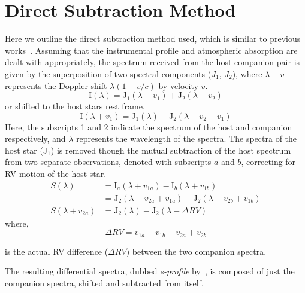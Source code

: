 \documentclass[fleqn,usenatbib]{mnras}
\begin{document}
    \section{Direct Subtraction Method}
    \label{appendix:A1}
    Here we outline the direct subtraction method used, which is similar to previous works~\citep{ferluga_separating_1997,kostogryz_spectral_2013}. Assuming that the instrumental profile and atmospheric absorption are dealt with appropriately, the spectrum received from the host-companion pair is given by the superposition of two spectral components (\(J_{1}\), \(J_{2}\)), where \(\lambda-v\) represents the Doppler shift \(\lambda(1-v/c)\) by velocity \(v\).
    \begin{equation}
    \textrm{I}(\lambda) = \textrm{J}_{1}(\lambda - v_{1}) + \textrm{J}_{2}(\lambda - v_{2})
    \end{equation}
    or shifted to the host stars rest frame,
    \begin{equation}
    \textrm{I}(\lambda + v_{1}) = \textrm{J}_{1}(\lambda) + \textrm{J}_{2}(\lambda - v_{2} + v_{1})
    \end{equation}
    Here, the subscripts 1 and 2 indicate the spectrum of the host and companion respectively, and \(\lambda\) represents the wavelength of the spectra.
    The spectra of the host star (\(\textrm{J}_{1}\)) is removed though the mutual subtraction of the host spectrum from two separate observations, denoted with subscripts \(a\) and \(b\), correcting for RV motion of the host star.
    \begin{align}
    S(\lambda) &= \textrm{I}_{a}(\lambda + v_{1a}) - \textrm{I}_{b}(\lambda + v_{1b}) \nonumber \\
    &= \textrm{J}_{2}(\lambda - v_{2a} + v_{1a}) - \textrm{J}_{2}(\lambda - v_{2b} + v_{1b}) \nonumber \\
    S(\lambda + v_{2a}) &= \textrm{J}_{2}(\lambda) - \textrm{J}_{2}(\lambda - \Delta RV ) \label{eqn:sprofile}
    \end{align}
    where,
    \begin{equation}
    \Delta RV = v_{1a} - v_{1b} - v_{2a} + v_{2b} \label{eqn:k}
    \end{equation}

    is the actual RV difference (\(\Delta RV\)) between the two companion spectra.

    The resulting differential spectra, dubbed \emph{s-profile} by~\citet{ferluga_separating_1997}, is composed of just the companion spectra, shifted and subtracted from itself.
\end{document}
